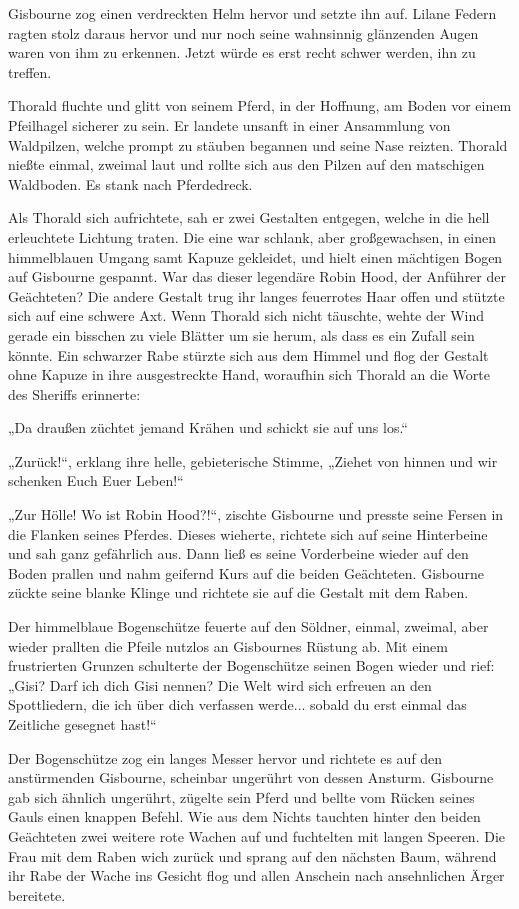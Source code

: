 Gisbourne zog einen verdreckten Helm hervor und setzte ihn auf. Lilane Federn ragten stolz daraus hervor und nur noch seine wahnsinnig glänzenden Augen waren von ihm zu erkennen. Jetzt würde es erst recht schwer werden, ihn zu treffen.

Thorald fluchte und glitt von seinem Pferd, in der Hoffnung, am Boden vor einem Pfeilhagel sicherer zu sein. Er landete unsanft in einer Ansammlung von Waldpilzen, welche prompt zu stäuben begannen und seine Nase reizten. Thorald nießte einmal, zweimal laut und rollte sich aus den Pilzen auf den matschigen Waldboden. Es stank nach Pferdedreck.

Als Thorald sich aufrichtete, sah er zwei Gestalten entgegen, welche in die hell erleuchtete Lichtung traten. Die eine war schlank, aber großgewachsen, in einen himmelblauen Umgang samt Kapuze gekleidet, und hielt einen mächtigen Bogen auf Gisbourne gespannt. War das dieser legendäre Robin Hood, der Anführer der Geächteten? Die andere Gestalt trug ihr langes feuerrotes Haar offen und stützte sich auf eine schwere Axt. Wenn Thorald sich nicht täuschte, wehte der Wind gerade ein bisschen zu viele Blätter um sie herum, als dass es ein Zufall sein könnte. Ein schwarzer Rabe stürzte sich aus dem Himmel und flog der Gestalt ohne Kapuze in ihre ausgestreckte Hand, woraufhin sich Thorald an die Worte des Sheriffs erinnerte:

„Da draußen züchtet jemand Krähen und schickt sie auf uns los.“

„Zurück!“, erklang ihre helle, gebieterische Stimme, „Ziehet von hinnen und wir schenken Euch Euer Leben!“

„Zur Hölle! Wo ist Robin Hood?!“, zischte Gisbourne und presste seine Fersen in die Flanken seines Pferdes. Dieses wieherte, richtete sich auf seine Hinterbeine und sah ganz gefährlich aus. Dann ließ es seine Vorderbeine wieder auf den Boden prallen und nahm geifernd Kurs auf die beiden Geächteten. Gisbourne zückte seine blanke Klinge und richtete sie auf die Gestalt mit dem Raben.

Der himmelblaue Bogenschütze feuerte auf den Söldner, einmal, zweimal, aber wieder prallten die Pfeile nutzlos an Gisbournes Rüstung ab. Mit einem frustrierten Grunzen schulterte der Bogenschütze seinen Bogen wieder und rief: „Gisi? Darf ich dich Gisi nennen? Die Welt wird sich erfreuen an den Spottliedern, die ich über dich verfassen werde... sobald du erst einmal das Zeitliche gesegnet hast!“

Der Bogenschütze zog ein langes Messer hervor und richtete es auf den anstürmenden Gisbourne, scheinbar ungerührt von dessen Ansturm. Gisbourne gab sich ähnlich ungerührt, zügelte sein Pferd und bellte vom Rücken seines Gauls einen knappen Befehl. Wie aus dem Nichts tauchten hinter den beiden Geächteten zwei weitere rote Wachen auf und fuchtelten mit langen Speeren. Die Frau mit dem Raben wich zurück und sprang auf den nächsten Baum, während ihr Rabe der Wache ins Gesicht flog und allen Anschein nach ansehnlichen Ärger bereitete.

